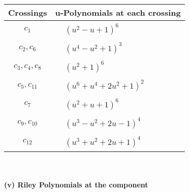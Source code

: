 \documentclass[1p]{elsarticle_modified}
\theoremstyle{definition}
\begin{document}
\begin{tabular}{m{50pt}|m{274pt}}
Crossings & \hspace{64pt}u-Polynomials at each crossing \\
\hline $$\begin{aligned}c_{1}\end{aligned}$$&$\begin{aligned}
&(u^2- u+1)^6
\end{aligned}$\\
\hline $$\begin{aligned}c_{2},c_{6}\end{aligned}$$&$\begin{aligned}
&(u^4- u^2+1)^3
\end{aligned}$\\
\hline $$\begin{aligned}c_{3},c_{4},c_{8}\end{aligned}$$&$\begin{aligned}
&(u^2+1)^6
\end{aligned}$\\
\hline $$\begin{aligned}c_{5},c_{11}\end{aligned}$$&$\begin{aligned}
&(u^6+u^4+2 u^2+1)^2
\end{aligned}$\\
\hline $$\begin{aligned}c_{7}\end{aligned}$$&$\begin{aligned}
&(u^2+u+1)^6
\end{aligned}$\\
\hline $$\begin{aligned}c_{9},c_{10}\end{aligned}$$&$\begin{aligned}
&(u^3- u^2+2 u-1)^4
\end{aligned}$\\
\hline $$\begin{aligned}c_{12}\end{aligned}$$&$\begin{aligned}
&(u^3+u^2+2 u+1)^4
\end{aligned}$\\
\hline
\end{tabular}\\~\\
\newpage\renewcommand{\arraystretch}{1}
\flushleft \textbf{(v) Riley Polynomials at the component}\newline \\
\end{document}
